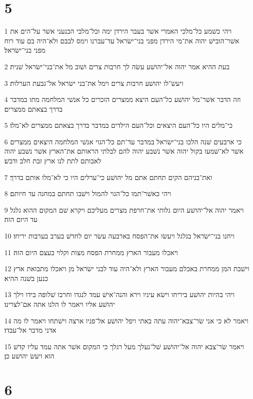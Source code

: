 \chapter{5}

\par 1 ויהי כשׁמע כל־מלכי האמרי אשׁר בעבר הירדן ימה וכל־מלכי הכנעני אשׁר על־הים את אשׁר־הובישׁ יהוה את־מי הירדן מפני בני־ישׂראל עד־עברנו וימס לבבם ולא־היה בם עוד רוח מפני בני־ישׂראל׃
\par 2 בעת ההיא אמר יהוה אל־יהושׁע עשׂה לך חרבות צרים ושׁוב מל את־בני־ישׂראל שׁנית׃
\par 3 ויעשׂ־לו יהושׁע חרבות צרים וימל את־בני ישׂראל אל־גבעת הערלות׃
\par 4 וזה הדבר אשׁר־מל יהושׁע כל־העם היצא ממצרים הזכרים כל אנשׁי המלחמה מתו במדבר בדרך בצאתם ממצרים׃
\par 5 כי־מלים היו כל־העם היצאים וכל־העם הילדים במדבר בדרך בצאתם ממצרים לא־מלו׃
\par 6 כי ארבעים שׁנה הלכו בני־ישׂראל במדבר עד־תם כל־הגוי אנשׁי המלחמה היצאים ממצרים אשׁר לא־שׁמעו בקול יהוה אשׁר נשׁבע יהוה להם לבלתי הראותם את־הארץ אשׁר נשׁבע יהוה לאבותם לתת לנו ארץ זבת חלב ודבשׁ׃
\par 7 ואת־בניהם הקים תחתם אתם מל יהושׁע כי־ערלים היו כי לא־מלו אותם בדרך׃
\par 8 ויהי כאשׁר־תמו כל־הגוי להמול וישׁבו תחתם במחנה עד חיותם׃
\par 9 ויאמר יהוה אל־יהושׁע היום גלותי את־חרפת מצרים מעליכם ויקרא שׁם המקום ההוא גלגל עד היום הזה׃
\par 10 ויחנו בני־ישׂראל בגלגל ויעשׂו את־הפסח בארבעה עשׂר יום לחדשׁ בערב בערבות יריחו׃
\par 11 ויאכלו מעבור הארץ ממחרת הפסח מצות וקלוי בעצם היום הזה׃
\par 12 וישׁבת המן ממחרת באכלם מעבור הארץ ולא־היה עוד לבני ישׂראל מן ויאכלו מתבואת ארץ כנען בשׁנה ההיא׃
\par 13 ויהי בהיות יהושׁע ביריחו וישׂא עיניו וירא והנה־אישׁ עמד לנגדו וחרבו שׁלופה בידו וילך יהושׁע אליו ויאמר לו הלנו אתה אם־לצרינו׃
\par 14 ויאמר לא כי אני שׂר־צבא־יהוה עתה באתי ויפל יהושׁע אל־פניו ארצה וישׁתחו ויאמר לו מה אדני מדבר אל־עבדו׃
\par 15 ויאמר שׂר־צבא יהוה אל־יהושׁע שׁל־נעלך מעל רגלך כי המקום אשׁר אתה עמד עליו קדשׁ הוא ויעשׂ יהושׁע כן׃

\chapter{6}

